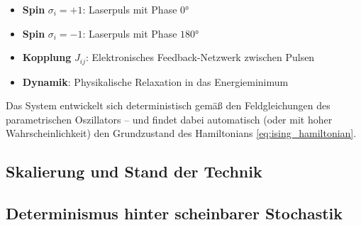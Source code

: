 \begin{itemize}
    \item \textbf{Spin} $\sigma_i = +1$: Laserpuls mit Phase $0°$
    \item \textbf{Spin} $\sigma_i = -1$: Laserpuls mit Phase $180°$
    \item \textbf{Kopplung} $J_{ij}$: Elektronisches Feedback-Netzwerk zwischen Pulsen
    \item \textbf{Dynamik}: Physikalische Relaxation in das Energieminimum
\end{itemize}

Das System entwickelt sich deterministisch gemäß den Feldgleichungen des 
parametrischen Oszillators -- und findet dabei automatisch (oder mit hoher 
Wahrscheinlichkeit) den Grundzustand des Hamiltonians \eqref{eq:ising_hamiltonian}.

\subsection{Skalierung und Stand der Technik}

\begin{table}[h]
    \centering
    \caption{Vergleich: Klassischer Rechner vs.\ Coherent Ising Machine}
    \label{tab:cim_vs_classical}
\end{table}

\subsection{Determinismus hinter scheinbarer Stochastik}
\label{subsec:cim_determinism}

